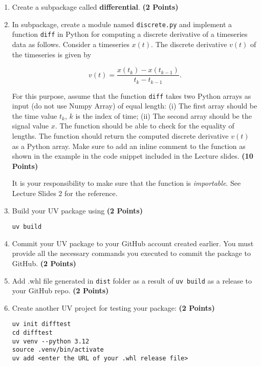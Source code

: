 \documentclass[12pt, xcolor=dvipsnames,svgnames,x11names]{article}
\begin{document}
\begin{enumerate}
\item Create a subpackage called \textbf{differential}. \hfill \textbf{(2 Points)}
\item In subpackage, create a module named \texttt{discrete.py} and implement a function \texttt{diff} in Python for computing a discrete derivative of a timeseries data as follows. Consider a timeseries $x(t)$. The discrete derivative $v(t)$ of the timeseries is given by 

$$
v(t) = \frac{x(t_k) - x(t_{k-1})}{t_k - t_{k-1}}.
$$

For this purpose, assume that the function \texttt{diff} takes two Python arrays as input (do not use Numpy Array) of equal length: (i) The first array should be the time value $t_k$, $k$ is the index of time; (ii) The second array should be the signal value $x$. The function should be able to check for the equality of lengths. The function should return the computed discrete derivative $v(t)$ as a Python array. Make sure to add an inline comment to the function as shown in the example in the code snippet included in the Lecture slides. \hfill \textbf{(10 Points)}

It is your responsibility to make sure that the function is \textit{importable}. See Lecture Slides 2 for the reference.

\item Build your UV package using \hfill \textbf{(2 Points)}

\begin{verbatim}
uv build
\end{verbatim}

\item Commit your UV package to your GitHub account created earlier. You must provide all the necessary commands you executed to commit the package to GitHub. \hfill \textbf{(2 Points)}

\item Add .whl file generated in \texttt{dist} folder as a result of \texttt{uv build} as a release to your GitHub repo. \hfill \textbf{(2 Points)}

\item Create another UV project for testing your package: \hfill \textbf{(2 Points)}

\begin{verbatim}
uv init difftest
cd difftest
uv venv --python 3.12
source .venv/bin/activate
uv add <enter the URL of your .whl release file>
\end{verbatim}


\end{enumerate}
\end{document}
